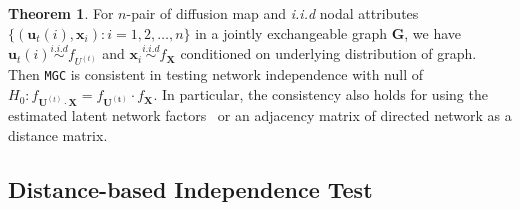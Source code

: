 \documentclass[11pt]{article}
\theoremstyle{definition}
\newtheorem{theorem}{Theorem}[section]
\begin{document}
\begin{theorem}
	\label{theorem2}
	For $n$-pair of diffusion map and \textit{i.i.d} nodal attributes $\{ ( \mathbf{u}_{t}(i),  \mathbf{x}_{i}  ) : i =1,2, \ldots , n \}$ in a jointly exchangeable graph $\mathbf{G}$, we have $\mathbf{u}_{t}(i) \overset{i.i.d}{\sim} f_{U^{(t)}}$ and $\mathbf{x}_{i} \overset{i.i.d}{\sim} f_{\mathbf{X}}$ conditioned on underlying distribution of graph. 
	Then \texttt{MGC} is consistent in testing network independence with null of $H_{0}: f_{\mathbf{U}^{(t)} \cdot \mathbf{X}  }  = f_{\mathbf{U^{(t)}}} \cdot f_{\mathbf{X}}$. In particular, the consistency also holds for using the estimated latent network factors~\citep{fosdick2015testing} or an adjacency matrix of directed network as a distance matrix.
\end{theorem}

	\vspace*{-0.4cm}
\subsection{Distance-based Independence Test}
\label{ssec:method1}
\end{document}
